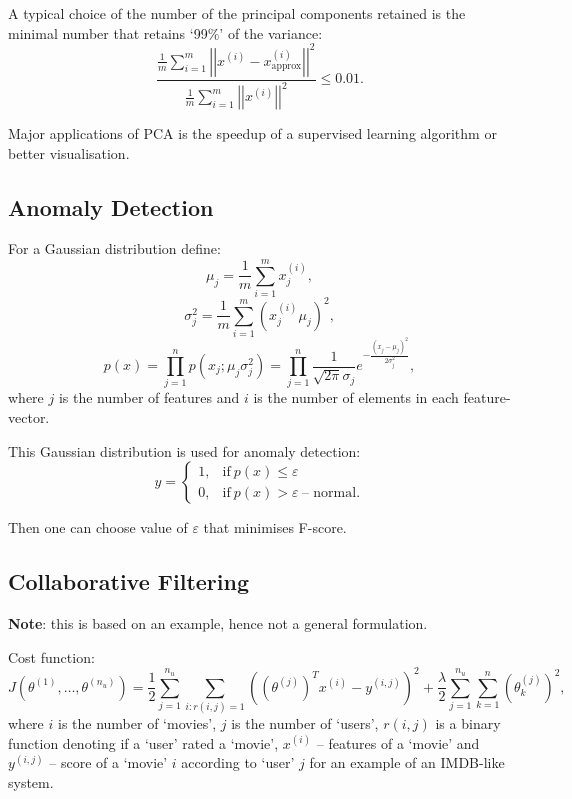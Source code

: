 \documentclass[a4paper,11pt]{article}
\begin{document}
A typical choice of the number of the principal components retained is the minimal number that retains `99\%' of the variance:
\begin{equation}
\frac{\frac{1}{m}\sum\limits_{i = 1} ^m \left| \left| x^{(i)} - x_{\text{approx}} ^{(i)} \right| \right|^2}{\frac{1}{m}\sum\limits_{i = 1} ^m \left| \left| x^{(i)} \right| \right|^2} \leq 0.01 .
\end{equation}

Major applications of PCA is the speedup of a supervised learning algorithm or better visualisation.
\subsection{Anomaly Detection}
For a Gaussian distribution define:
\begin{equation}
\mu_j = \frac{1}{m} \sum_{i = 1} ^m x_j ^{(i)} ,
\end{equation}
\begin{equation}
\sigma_j ^2 = \frac{1}{m} \sum_{i = 1} ^m \left(x_j ^{(i)} \mu_j \right)^2 ,
\end{equation}
\begin{equation}
p (x) = \prod_{j=1} ^n p \left( x_j ; \mu_j \sigma_j ^2 \right) = \prod_{j=1} ^n \frac{1}{\sqrt{2\pi} \sigma_j} e^{-\frac{(x_j - \mu_j)^2}{2 \sigma_j ^2}} ,
\end{equation}
where \textcolor{OliveGreen}{$j$} is the number of features and \textcolor{OliveGreen}{$i$} is the number of elements in each feature-vector.

This Gaussian distribution is used for anomaly detection:
\begin{equation}
y = \begin{cases}
      1, & \text{if}\ p(x) \leq \varepsilon \\
      0, & \text{if}\ p(x) > \varepsilon\ \text{-- normal} .
    \end{cases}
\end{equation}

Then one can choose value of \textcolor{OliveGreen}{$\varepsilon$} that minimises F-score.

\subsection{Collaborative Filtering}
\textbf{Note}: this is based on an example, hence not a general formulation.

Cost function:
\begin{equation}
J \left( \theta^{(1)}, \ldots , \theta^{(n_u)} \right) = \frac{1}{2} \sum_{j=1} ^{n_u} \sum_{i:r(i,j)=1} \left( \left(\theta^{(j)} \right)^T x^{(i)} - y^{(i,j)} \right)^2 + \frac{\lambda}{2} \sum_{j=1} ^{n_u} \sum_{k=1} ^n \left(\theta^{(j)} _k \right)^2 ,
\end{equation}
where \textcolor{OliveGreen}{$i$} is the number of `movies', \textcolor{OliveGreen}{$j$} is the number of `users', \textcolor{OliveGreen}{$r(i,j)$} is a binary function denoting if a `user' rated a `movie', \textcolor{OliveGreen}{$x^{(i)}$} -- features of a `movie' and \textcolor{OliveGreen}{$y^{(i,j)}$} -- score of a `movie' \textcolor{OliveGreen}{$i$} according to `user' \textcolor{OliveGreen}{$j$} for an example of an IMDB-like system.
\end{document}
